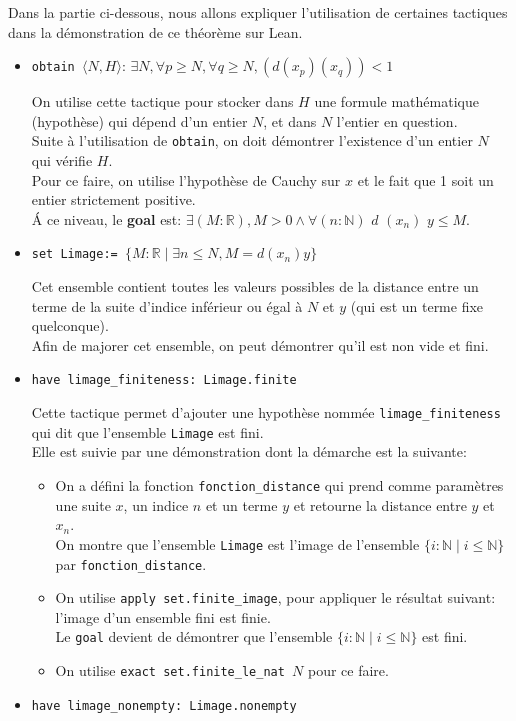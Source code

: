 Dans la partie ci-dessous, nous allons expliquer l'utilisation de certaines tactiques dans la démonstration de ce théorème sur Lean.\\
\begin{itemize}
    \item \texttt{obtain $\langle N, H \rangle $}: $\exists N, \forall p \geq N, \forall q \geq N, (d (x_p) (x_q)) < 1$
    
    On utilise cette tactique pour stocker dans $H$ une formule mathématique (hypothèse) qui dépend d'un entier $N$, et dans $N$ l'entier en question. \\ Suite à l'utilisation de \texttt{obtain}, on doit démontrer l'existence d'un entier $N$ qui vérifie $H$.\\ Pour ce faire, on utilise l'hypothèse de Cauchy sur $x$ et le fait que 1 soit un entier strictement positive.\\
    \'A ce niveau, le \textbf{goal} est: $\exists (M:\mathbb{R}), M > 0 \wedge \forall (n : \mathbb{N})$ $d$ $(x_n)$ $y \leq M$.
    \item \texttt{set Limage:= $\big\{ M: \mathbb{R} \mid \exists n\leq N, M = d(x_n)y \big\}$}
    
    
    Cet ensemble contient toutes les valeurs possibles de la distance entre un terme de la suite d'indice inférieur ou égal à $N$ et $y$ (qui est un terme fixe quelconque).\\ Afin de majorer cet ensemble, on peut démontrer qu'il est non vide et fini.
    \item \texttt{have limage\_finiteness: Limage.finite}
    
    
     Cette tactique permet d'ajouter une hypothèse nommée \texttt{limage\_finiteness} qui dit que l'ensemble \texttt{Limage} est fini.\\ Elle est suivie par une démonstration dont la démarche est la suivante:
    \begin{itemize}
         \item On a défini la fonction \texttt{fonction\_distance} qui prend comme paramètres une suite $x$, un indice $n$ et un terme $y$ et retourne la distance entre $y$ et $x_n$. \\ On montre que l'ensemble \texttt{Limage} est l'image de l'ensemble $\big\{i:\mathbb{N}\mid i\leq \mathbb{N}\big\}$ par \texttt{fonction\_distance}.
        \item On utilise \texttt{apply set.finite\_image}, pour appliquer le résultat suivant: l'image d'un ensemble fini est finie. \\ Le \texttt{goal} devient de démontrer que l'ensemble $\big\{i:\mathbb{N}\mid i\leq \mathbb{N}\big\}$ est fini.
        \item On utilise \texttt{exact set.finite\_le\_nat $N$} pour ce faire.
    \end{itemize}
    \item \texttt{have limage\_nonempty: Limage.nonempty} 
    

\end{itemize}
